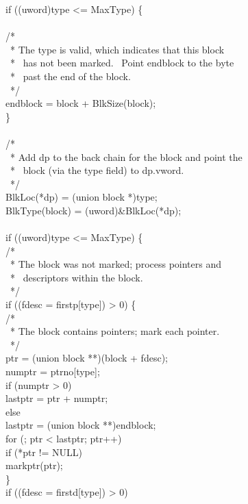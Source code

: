 {\>\>if ((uword)type <= MaxType) \{\\
\\
\>\>\>/*\\
\>\>\>\ * The type is valid, which indicates that this block\\
\>\>\>\ * \ has not been marked. \ Point endblock to the byte\\
\>\>\>\ * \ past the end of the block.\\
\>\>\>\ */\\
\>\>\>endblock = block + BlkSize(block);\\
\>\>\>\}\\
\\
\>\>/*\\
\>\>\ * Add dp to the back chain for the block and point the\\
\>\>\ * \ block (via the type field) to dp.vword.\\
\>\>\ */\\
\>\>BlkLoc(*dp) = (union block *)type;\\
\>\>BlkType(block) = (uword)\&BlkLoc(*dp);\\
\\
\>\>if ((uword)type <= MaxType) \{\\
\>\>\>/*\\
\>\>\>\ * The block was not marked; process pointers and\\
\>\>\>\ * \ descriptors within the block.\\
\>\>\>\ */\\
\>\>\>if ((fdesc = firstp[type]) > 0) \{\\
\>\>\>\>/*\\
\>\>\>\>\ * The block contains pointers; mark each pointer.\\
\>\>\>\>\ */\\
\>\>\>\>ptr = (union block **)(block + fdesc);\\
\>\>\>\>numptr = ptrno[type];\\
\>\>\>\>if (numptr > 0)\\
\>\>\>\>\>lastptr = ptr + numptr;\\
\>\>\>\>else\\
\>\>\>\>\>lastptr = (union block **)endblock;\\
\>\>\>\>for (; ptr < lastptr; ptr++)\\
\>\>\>\>\>if (*ptr != NULL)\\
\>\>\>\>\>\>markptr(ptr);\\
\>\>\>\>\}\\
\>\>\>if ((fdesc = firstd[type]) > 0)\\
}
